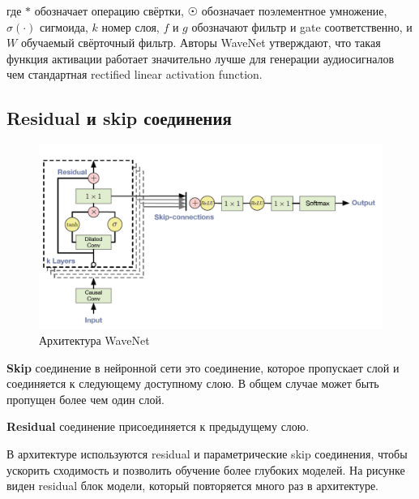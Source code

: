 \documentclass[../diploma.tex]{subfiles}
\begin{document}
где $*$ обозначает операцию свёртки, $\astrosun$ обозначает поэлементное умножение, $\sigma(\cdot)$ сигмоида, $k$ номер слоя, $f$ и $g$ обозначают фильтр и gate соответственно, и $W$ обучаемый свёрточный фильтр. Авторы WaveNet утверждают, что такая функция активации работает значительно лучше для генерации аудиосигналов чем стандартная rectified linear activation function.

\newpage
\subsection{Residual и skip соединения}

\begin{figure}[ht!]
  \centering
  \includegraphics[scale=0.35]{img/wavenet}
  \caption{Архитектура WaveNet}
  \label{fig:wavenet_arch}
\end{figure}

\begin{definition}
\textbf{Skip} соединение в нейронной сети это соединение, которое пропускает слой и соединяется к следующему доступному слою. В общем случае может быть пропущен более чем один слой.
\end{definition}

\begin{definition}
\textbf{Residual} соединение присоединяется к предыдущему слою.
\end{definition}

В архитектуре используются residual и параметрические skip соединения, чтобы ускорить сходимость и позволить обучение более глубоких моделей. На рисунке \label{fig:wavenet_arch} виден residual блок модели, который повторяется много раз в архитектуре. 

\newpage
\end{document}
